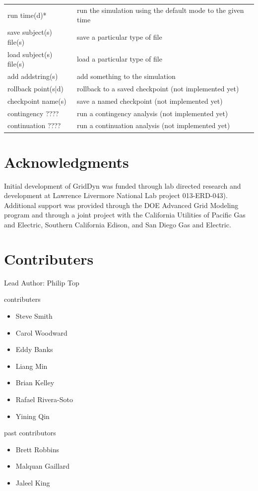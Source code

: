 \documentclass[12pt]{article} %
\begin{document}
\begin{table}[ht]
\begin{tabular}{l p{7cm}}
	run time(d)* & 	run the simulation using the default mode to the given time \\
	save subject(s) file(s) & save a particular type of file \\
	load subject(s) file(s) & load  a particular type of file \\
	add addstring(s) & add something to the simulation  \\
	rollback point(s|d)  & rollback to a saved checkpoint (not implemented yet) \\
	checkpoint name(s) &  save a named checkpoint (not implemented yet) \\
	contingency ????  &  run a contingency analysis (not implemented yet) \\
	continuation ???? & run a continuation analysis (not implemented yet) \\
	
		
		\hline %
	\end{tabular}
	\label{table:actions}
\end{table}

\section{Acknowledgments}
Initial development of GridDyn was funded through lab directed research and development at Lawrence Livermore National Lab project 013-ERD-043).  Additional support was provided through the DOE Advanced Grid Modeling program and through a joint project with the California Utilities of Pacific Gas and Electric, Southern California Edison, and San Diego Gas and Electric.  

\clearpage

\section{Contributers}
Lead Author: Philip Top

contributers
\begin{itemize}
	\item Steve Smith
	\item Carol Woodward
	\item Eddy Banks
	\item Liang Min
	\item Brian Kelley
	\item Rafael Rivera-Soto
	\item Yining Qin
\end{itemize}
past contributors
\begin{itemize}
	\item Brett Robbins
	\item Malquan Gaillard
	\item Jaleel King
	
\end{itemize}
\end{document}
